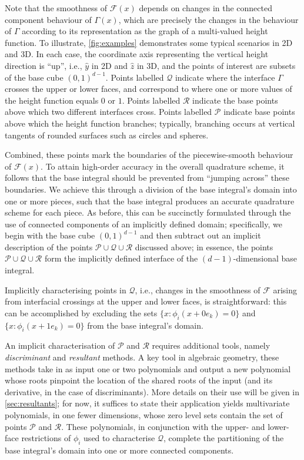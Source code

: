 \documentclass[onefignum,onetabnum,onealgnum,oneeqnum]{siamart190516}
\begin{document}
%
%

Note that the smoothness of ${\mathcal F}(x)$ depends on changes in the connected component behaviour of $\Gamma(x)$, which are precisely the changes in the behaviour of $\Gamma$ according to its representation as the graph of a multi-valued height function. To illustrate, \cref{fig:examples} demonstrates some typical scenarios in 2D and 3D. In each case, the coordinate axis representing the vertical height direction is ``up'', i.e., $\hat y$ in 2D and $\hat z$ in 3D, and the points of interest are subsets of the base cube $(0,1)^{d-1}$. Points labelled $\mathcal Q$ indicate where the interface $\Gamma$ crosses the upper or lower faces, and correspond to where one or more values of the height function equals $0$ or $1$. Points labelled $\mathcal R$ indicate the base points above which two different interfaces cross. Points labelled $\mathcal P$ indicate base points above which the height function branches; typically, branching occurs at vertical tangents of rounded surfaces such as circles and spheres. 

Combined, these points mark the boundaries of the piecewise-smooth behaviour of ${\mathcal F}(x)$. To attain high-order accuracy in the overall quadrature scheme, it follows that the base integral should be prevented from ``jumping across'' these boundaries. We achieve this through a division of the base integral's domain into one or more pieces, such that the base integral produces an accurate quadrature scheme for each piece. As before, this can be succinctly formulated through the use of connected components of an implicitly defined domain; specifically, we begin with the base cube $(0,1)^{d-1}$ and then subtract out an implicit description of the points $\mathcal P \cup \mathcal Q \cup \mathcal R$ discussed above; in essence, the points $\mathcal P \cup \mathcal Q \cup \mathcal R$ form the implicitly defined interface of the $(d-1)$-dimensional base integral.

Implicitly characterising points in $\mathcal Q$, i.e., changes in the smoothness of ${\mathcal F}$ arising from interfacial crossings at the upper and lower faces, is straightforward: this can be accomplished by excluding the sets $\{x: \phi_i(x + 0 e_k) = 0\}$ and $\{x: \phi_i(x + 1 e_k) = 0\}$ from the base integral's domain.

%

An implicit characterisation of $\mathcal P$ and $\mathcal R$ requires additional tools, namely \textit{discriminant} and \textit{resultant} methods. A key tool in algebraic geometry, these methods take in as input one or two polynomials and output a new polynomial whose roots pinpoint the location of the shared roots of the input (and its derivative, in the case of discriminants). More details on their use will be given in \cref{sec:resultants}; for now, it suffices to state their application yields multivariate polynomials, in one fewer dimensions, whose zero level sets contain the set of points $\mathcal P$ and $\mathcal R$. These polynomials, in conjunction with the upper- and lower-face restrictions of $\phi_i$ used to characterise $\mathcal Q$, complete the partitioning of the base integral's domain into one or more connected components.
\end{document}
